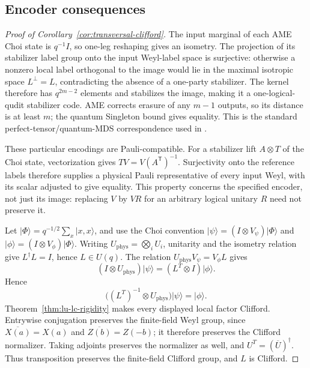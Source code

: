 \subsection{Encoder consequences}
\label{subsec:encoder-consequences}

\begin{proof}[Proof of Corollary~\ref{cor:transversal-clifford}]
The input marginal of each AME Choi state is \(q^{-1}I\), so one-leg
reshaping gives an isometry.  The projection of its stabilizer label group
onto the input Weyl-label space is surjective: otherwise a nonzero local
label orthogonal to the image would lie in the maximal isotropic space
\(L^\perp=L\), contradicting the absence of a one-party stabilizer.  The
kernel therefore has \(q^{2m-2}\) elements and stabilizes the image, making
it a one-logical-qudit stabilizer code.  AME corrects erasure of any
\(m-1\) outputs, so its distance is at least \(m\); the quantum Singleton
bound gives equality.  This is the standard perfect-tensor/quantum-MDS
correspondence used in \cite[Theorems~3.5 and 3.6]{Tan2026}.

These particular encodings are Pauli-compatible.  For a stabilizer lift
\(A\otimes T\) of the Choi state, vectorization gives
\(TV=V(A^{\mathsf T})^{-1}\).  Surjectivity onto the reference labels
therefore supplies a physical Pauli representative of every input Weyl,
with its scalar adjusted to give equality.  This property concerns the
specified encoder, not just its image: replacing \(V\) by \(VR\) for an
arbitrary logical unitary \(R\) need not preserve it.

Let \(\lvert\Phi\rangle=q^{-1/2}\sum_x\lvert x,x\rangle\), and use the
Choi convention
\(\lvert\psi\rangle=(I\otimes V_\psi)\lvert\Phi\rangle\) and
\(\lvert\phi\rangle=(I\otimes V_\phi)\lvert\Phi\rangle\).
Writing \(U_{\mathrm{phys}}=\bigotimes_iU_i\), unitarity and the
isometry relation give \(L^\dagger L=I\), hence \(L\in U(q)\).
The relation
\(U_{\mathrm{phys}}V_\psi=V_\phi L\) gives
\[
 (I\otimes U_{\mathrm{phys}})\lvert\psi\rangle
   =(L^T\otimes I)\lvert\phi\rangle .
\]
Hence
\[
 \bigl((L^T)^{-1}\otimes U_{\mathrm{phys}}\bigr)
   \lvert\psi\rangle=\lvert\phi\rangle .
\]
Theorem~\ref{thm:lu-lc-rigidity} makes every displayed local factor
Clifford.  Entrywise conjugation preserves the finite-field Weyl group,
since \(\overline{X(a)}=X(a)\) and
\(\overline{Z(b)}=Z(-b)\); it therefore preserves the Clifford
normalizer.  Taking adjoints preserves the normalizer as well, and
\(U^T=(\overline U)^\dagger\).  Thus transposition preserves the
finite-field Clifford group, and \(L\) is Clifford.
\end{proof}

